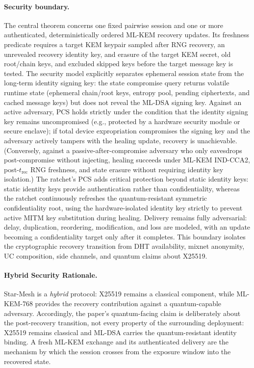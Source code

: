 \documentclass[11pt,a4paper]{article}
\theoremstyle{remark}
\theoremstyle{plain}
\begin{document}
\paragraph{Security boundary.}
The central theorem concerns one fixed pairwise session and one or more authenticated,
deterministically ordered ML-KEM recovery updates.  Its freshness predicate requires a target
KEM keypair sampled after RNG recovery, an unrevealed recovery identity key, and erasure of the
target KEM secret, old root/chain keys, and excluded skipped keys before the target message key
is tested.  The security model explicitly separates ephemeral session state from the long-term
identity signing key: the state compromise query returns volatile runtime state (ephemeral
chain/root keys, entropy pool, pending ciphertexts, and cached message keys) but does not reveal
the ML-DSA signing key.  Against an active adversary, PCS holds strictly under the condition that the identity signing key
remains uncompromised (e.g., protected by a hardware security module or secure enclave); if total
device expropriation compromises the signing key and the adversary actively tampers with the healing update,
recovery is unachievable. (Conversely, against a passive-after-compromise adversary who only eavesdrops
post-compromise without injecting, healing succeeds under ML-KEM IND-CCA2, post-$t_{\mathrm{rec}}$ RNG freshness,
and state erasure without requiring identity key isolation.)  The ratchet's PCS adds
critical protection beyond static identity keys: static identity keys provide authentication rather
than confidentiality, whereas the ratchet continuously refreshes the quantum-resistant symmetric
confidentiality root, using the hardware-isolated identity key strictly to prevent active MITM
key substitution during healing.  Delivery remains fully adversarial: delay, duplication, reordering, modification,
and loss are modeled, with an update becoming a confidentiality target only after it completes.
This boundary isolates the cryptographic recovery transition from DHT availability, mixnet
anonymity, UC composition, side channels, and quantum claims about X25519.

\paragraph{Hybrid Security Rationale.}
Star-Mesh is a \emph{hybrid} protocol: X25519 remains a classical component, while ML-KEM-768
provides the recovery contribution against a quantum-capable adversary.  Accordingly, the
paper's quantum-facing claim is deliberately about the post-recovery transition, not every
property of the surrounding deployment: X25519 remains classical and ML-DSA carries the
quantum-resistant identity binding.  A fresh ML-KEM exchange and its authenticated delivery
are the mechanism by which the session crosses from the exposure window into the recovered
state.
\end{document}
